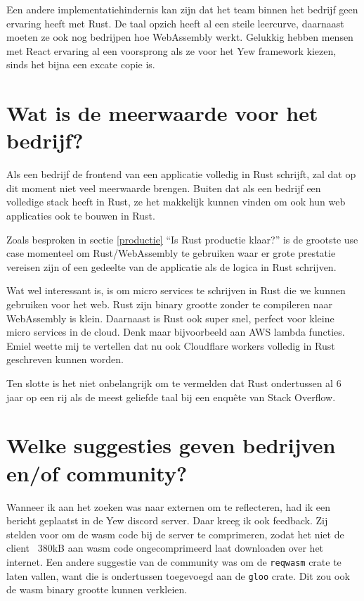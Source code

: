 Een andere implementatiehindernis kan zijn dat het team binnen het bedrijf geen ervaring heeft met
Rust. De taal opzich heeft al een steile leercurve, daarnaast moeten ze ook nog bedrijpen hoe
WebAssembly werkt. Gelukkig hebben mensen met React ervaring al een voorsprong als ze voor het Yew
framework kiezen, sinds het bijna een excate copie is.

\section{Wat is de meerwaarde voor het bedrijf?}

Als een bedrijf de frontend van een applicatie volledig in Rust schrijft, zal dat op dit moment niet
veel meerwaarde brengen. Buiten dat als een bedrijf een volledige stack heeft in Rust, ze het
makkelijk kunnen vinden om ook hun web applicaties ook te bouwen in Rust. 

Zoals besproken in sectie \ref{productie} \enquote{Is Rust productie klaar?} is de grootste use case
momenteel om Rust/WebAssembly te gebruiken waar er grote prestatie vereisen zijn of een gedeelte van
de applicatie als de logica in Rust schrijven.

Wat wel interessant is, is om micro services te schrijven in Rust die we kunnen gebruiken voor het
web. Rust zijn binary grootte zonder te compileren naar WebAssembly is klein. Daarnaast is Rust ook
super snel, perfect voor kleine micro services in de cloud. Denk maar bijvoorbeeld aan AWS lambda
functies. Emiel weette mij te vertellen dat nu ook Cloudflare workers volledig in Rust geschreven
kunnen worden. \cite{cloudflare_workers}

Ten slotte is het niet onbelangrijk om te vermelden dat Rust ondertussen al 6 jaar op een rij als de meest
geliefde taal bij een enquête van Stack Overflow. \cite{so_enquete} 

\section{Welke suggesties geven bedrijven en/of community?}

Wanneer ik aan het zoeken was naar externen om te reflecteren, had ik een bericht geplaatst in de
Yew discord server. Daar kreeg ik ook feedback. Zij stelden voor om de wasm code bij de server te
comprimeren, zodat het niet de client ~380kB aan wasm code ongecomprimeerd laat downloaden over het
internet. Een andere suggestie van de community was om de \texttt{reqwasm} crate te laten
vallen, want die is ondertussen toegevoegd aan de \texttt{gloo} crate. Dit zou ook de wasm
binary grootte kunnen verkleien.

